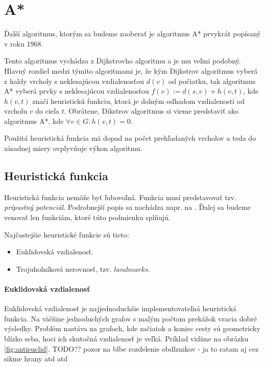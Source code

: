 \section{A*}
Ďalší algoritmus, ktorým sa budeme zaoberať je algoritmus
A* \cite{astar72} prvykrát popísaný v roku 1968.

Tento algoritmus vychádza z Dijkstrovho algoritmu a je mu veľmi podobný. Hlavný rozdiel medzi týmito algoritmami je, že
kým Dijkstrov algoritmus vyberá z haldy vrcholy s neklesajúcou vzdialenosťou $ d(v) $ od počiatku, tak algoritmus A* vyberá prvky s neklesajúcou vzdialenosťou $ f(v) := d(s,v) + h(v,t) $, kde $ h(v, t) $ značí heuristickú funkciu, ktorá je dolným odhadom vzdialenosti od vrcholu $ v $ do cieľa $ t $. Obrátene, Dikstrov algoritmus si vieme predstaviť ako algoritmus A*, kde $ \forall v \in G: h(v, t) = 0 $.

Použitá heuristická funkcia má dopad na počet prehľadaných vrcholov a teda do zásadnej miery ovplyvňuje výkon algoritmu.

\subsection{Heuristická funkcia}
 Heuristická funkcia nemôže byť ľubovoľná. Funkcia musí predstavovať tzv. {\sl prípustný potenciál}. Podrobnejší popis sa nachádza napr. na \cite{mares07} \cite{golberg01} \cite{goldbergharrelson05}. Ďalej sa budeme venovať len funkciám, ktoré túto podmienku splňujú.


Najčastejšie heuristické funkcie sú tieto:

\begin{itemize}
\item Euklidovská vzdialenosť.
\item Trojuholníková nerovnosť, tzv. $ landmarks $.
\end{itemize}


\paragraph{Euklidovská vzdialenosť}

Euklidovská vzdialenosť je najjednoduchšie implementovateľná heuristická funkcia. Na väčšine jednoduchých grafov s malým počtom prekážok vracia dobré výsledky. Problém nastáva na grafoch, kde začiatok a koniec cesty sú geometricky blízko seba, hoci ich skutočná vzdialenosť je veľká.
Príklad vidíme na obrázku \ref{fig:antieuclid}.
TODO?? pozor na blbe rozdelenie obdlznikov - ja to ratam 
aj cez sikme hrany atd atd


